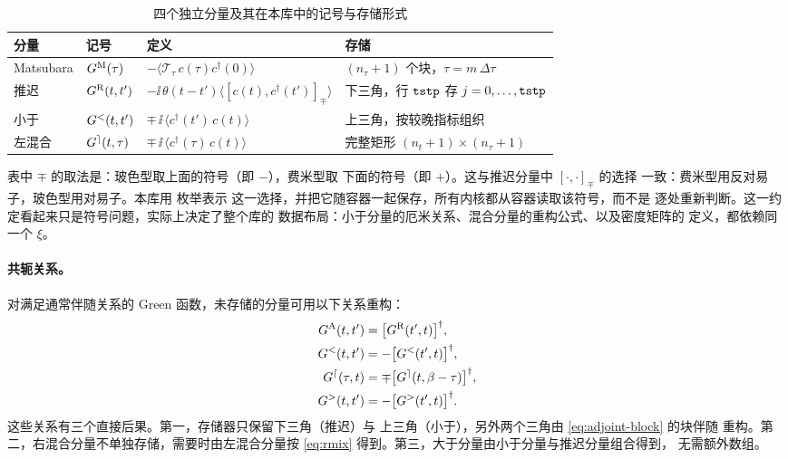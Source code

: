 \begin{table}[htbp]
    \centering
    \caption[四个独立分量及其在本库中的记号与存储形式]{四个独立分量及其在本库中的记号与存储形式}
    \label{tab:components}
    \small
    \begin{tabularx}{\textwidth}{@{}llXl@{}}
        \toprule
        分量 & 记号 & 定义 & 存储 \\
        \midrule
        Matsubara & $G^{\mathrm{M}}(\tau)$ &
            $-\langle \mathcal{T}_\tau\, c(\tau)c^{\dagger}(0)\rangle$ &
            $(n_\tau+1)$ 个块，$\tau = m\,\Delta\tau$ \\
        推迟 & $G^{\mathrm{R}}(t,t')$ &
            $-\ii\,\theta(t-t')\langle[c(t),c^{\dagger}(t')]_{\mp}\rangle$ &
            下三角，行 $\texttt{tstp}$ 存 $j=0,\dots,\texttt{tstp}$ \\
        小于 & $G^{<}(t,t')$ &
            $\mp\,\ii\,\langle c^{\dagger}(t')\,c(t)\rangle$ &
            上三角，按较晚指标组织 \\
        左混合 & $G^{\rceil}(t,\tau)$ &
            $\mp\,\ii\,\langle c^{\dagger}(\tau)\,c(t)\rangle$ &
            完整矩形 $(n_t+1)\times(n_\tau+1)$ \\
        \bottomrule
    \end{tabularx}
\end{table}

表中 $\mp$ 的取法是：玻色型取上面的符号（即 $-$），费米型取
下面的符号（即 $+$）。这与推迟分量中 $[\cdot,\cdot]_{\mp}$ 的选择
一致：费米型用反对易子，玻色型用对易子。本库用  枚举表示
这一选择，并把它随容器一起保存，所有内核都从容器读取该符号，而不是
逐处重新判断。这一约定看起来只是符号问题，实际上决定了整个库的
数据布局：小于分量的厄米关系、混合分量的重构公式、以及密度矩阵的
定义，都依赖同一个 $\xi$。

\paragraph{共轭关系。}
对满足通常伴随关系的 Green 函数，未存储的分量可用以下关系重构：
\begin{align}
    G^{\mathrm{A}}(t,t') &= \big[G^{\mathrm{R}}(t',t)\big]^{\dagger},
    \label{eq:adv}\\
    G^{<}(t,t') &= -\big[G^{<}(t',t)\big]^{\dagger},
    \label{eq:less-herm}\\
    G^{\lceil}(\tau,t) &= \mp\big[G^{\rceil}(t,\beta-\tau)\big]^{\dagger},
    \label{eq:rmix}\\
    G^{>}(t,t') &= -\big[G^{>}(t',t)\big]^{\dagger}.
    \label{eq:gt-herm}
\end{align}
这些关系有三个直接后果。第一，存储器只保留下三角（推迟）与
上三角（小于），另外两个三角由 \cref{eq:adjoint-block} 的块伴随
重构。第二，右混合分量不单独存储，需要时由左混合分量按
\cref{eq:rmix} 得到。第三，大于分量由小于分量与推迟分量组合得到，
无需额外数组。

